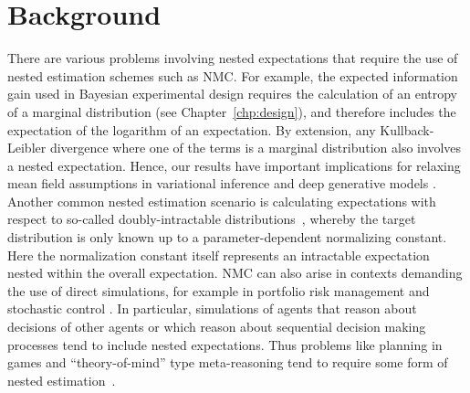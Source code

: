 
\section{Background}
\label{sec:intro}


There are various problems involving nested expectations that require the use of nested
estimation schemes such as NMC. For example, the expected information gain used in
Bayesian experimental design requires
the calculation of an entropy of a marginal distribution (see Chapter~\ref{chp:design}), and therefore includes the
expectation of the logarithm of an expectation.  By extension, any Kullback-Leibler
divergence where one of the terms is a marginal distribution also involves a nested expectation.  Hence, our results have important implications for relaxing mean field assumptions in variational
inference and deep generative models
\citep{burda2015importance,hoffman2015stochastic,maaloe2016auxiliary,naesseth2017variational,maddison2017filtering,
	le2017auto,rainforth2018tighter}.
Another common nested estimation scenario is calculating expectations with respect to so-called
doubly-intractable distributions~\citep{moller2006efficient,murray2006mcmc,liang2010double}, whereby
the target distribution is only known up to a parameter-dependent normalizing constant.  Here
the normalization constant itself represents an intractable expectation
nested within the overall expectation.
NMC can also arise in contexts demanding the use
of direct \mc simulations, for example in portfolio risk management
\citep{gordy2010nested} and stochastic control \citep{belomestny2010regression}. 
In particular, 
simulations of agents that reason about decisions of other agents or which
reason about sequential decision making processes tend to include nested expectations.
Thus problems like planning in games and ``theory-of-mind'' type meta-reasoning
tend to require some form of nested
 estimation~\citep{stuhlmuller2014reasoning,evans2017models}.

